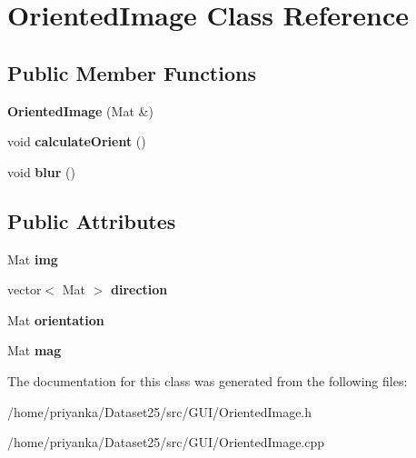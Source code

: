 \hypertarget{classOrientedImage}{\section{\-Oriented\-Image \-Class \-Reference}
\label{classOrientedImage}
}
\subsection*{\-Public \-Member \-Functions}
\begin{DoxyCompactItemize}
\item 
\hypertarget{classOrientedImage_a0250f06f59ff8ce4a310834fada6fd41}{{\bfseries \-Oriented\-Image} (\-Mat \&)}\label{classOrientedImage_a0250f06f59ff8ce4a310834fada6fd41}

\item 
\hypertarget{classOrientedImage_a2f50d2c5e6ee25ed0a239e6980220d88}{void {\bfseries calculate\-Orient} ()}\label{classOrientedImage_a2f50d2c5e6ee25ed0a239e6980220d88}

\item 
\hypertarget{classOrientedImage_a932bbc6e7b63ff588cac141cbcc1106d}{void {\bfseries blur} ()}\label{classOrientedImage_a932bbc6e7b63ff588cac141cbcc1106d}

\end{DoxyCompactItemize}
\subsection*{\-Public \-Attributes}
\begin{DoxyCompactItemize}
\item 
\hypertarget{classOrientedImage_ae66b3ec7d333c3b0fee903621db1c5ca}{\-Mat {\bfseries img}}\label{classOrientedImage_ae66b3ec7d333c3b0fee903621db1c5ca}

\item 
\hypertarget{classOrientedImage_a255499d9697a23eb069d43093ee3d234}{vector$<$ \-Mat $>$ {\bfseries direction}}\label{classOrientedImage_a255499d9697a23eb069d43093ee3d234}

\item 
\hypertarget{classOrientedImage_aad0fb09bf554c108b7b7c3ffcea29c5f}{\-Mat {\bfseries orientation}}\label{classOrientedImage_aad0fb09bf554c108b7b7c3ffcea29c5f}

\item 
\hypertarget{classOrientedImage_a0a4df5ff44a51133f542eb72cfbbef42}{\-Mat {\bfseries mag}}\label{classOrientedImage_a0a4df5ff44a51133f542eb72cfbbef42}

\end{DoxyCompactItemize}


\-The documentation for this class was generated from the following files\-:\begin{DoxyCompactItemize}
\item 
/home/priyanka/\-Dataset25/src/\-G\-U\-I/\-Oriented\-Image.\-h\item 
/home/priyanka/\-Dataset25/src/\-G\-U\-I/\-Oriented\-Image.\-cpp\end{DoxyCompactItemize}
